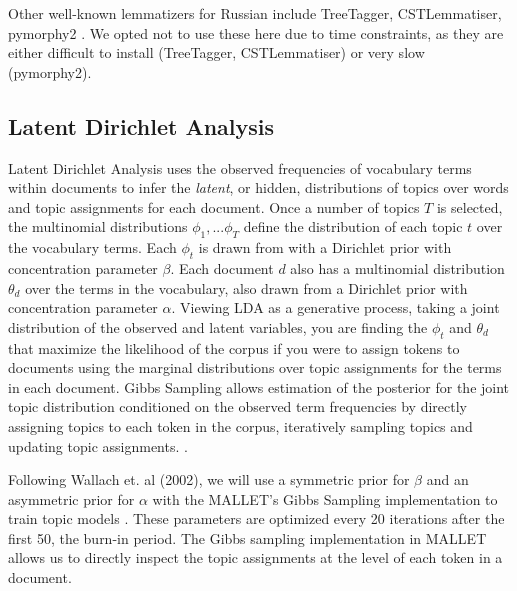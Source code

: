 \documentclass[11pt,a4paper]{article}
\begin{document}
Other well-known lemmatizers for Russian include TreeTagger, CSTLemmatiser, pymorphy2 \cite{May2016AnAO,Sharoff2011ThePP,pymorphy2}. We opted not to use these here due to time constraints, as they are either difficult to install (TreeTagger, CSTLemmatiser) or very slow (pymorphy2).

\subsection{Latent Dirichlet Analysis}
Latent Dirichlet Analysis uses the observed frequencies of vocabulary terms within documents to infer the \textit{latent}, or hidden, distributions of topics over words and topic assignments for each document. Once a number of topics $T$ is selected, the multinomial distributions $\phi_1,...\phi_T$ define the distribution of each topic $t$ over the vocabulary terms. Each $\phi_t$ is drawn from with a Dirichlet prior with concentration parameter $\beta$. Each document $d$ also has a multinomial distribution $\theta_d$ over the terms in the vocabulary, also drawn from a Dirichlet prior with concentration parameter $\alpha$. Viewing LDA as a generative process, taking a joint distribution of the observed and latent variables, you are finding the $\phi_t$ and $\theta_d$ that maximize the likelihood of the corpus if you were to assign tokens to documents using the marginal distributions over topic assignments for the terms in each document. Gibbs Sampling allows estimation of the posterior for the joint topic distribution conditioned on the observed term frequencies by directly assigning topics to each token in the corpus, iteratively sampling topics and updating topic assignments.
 \cite{steyvers2007probabilistic, blei2003,schofield-mimno-2016-comparing}.

Following Wallach et. al (2002), we will use a symmetric prior for $\beta$ and an asymmetric prior for $\alpha$ with the MALLET's Gibbs Sampling implementation to train topic models \cite{wallach2009rethinking,McCallumMALLET}. These parameters are optimized every 20 iterations after the first 50, the burn-in period. The Gibbs sampling implementation in MALLET allows us to directly inspect the topic assignments at the level of each token in a document.
\end{document}
